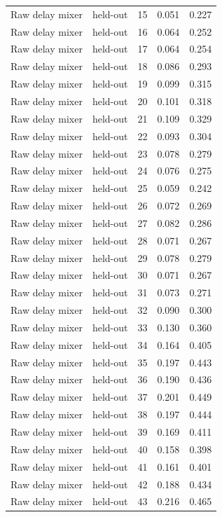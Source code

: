 \begin{tabular}{llrrr}
Raw delay mixer & held-out & 15 & 0.051 & 0.227 \\
Raw delay mixer & held-out & 16 & 0.064 & 0.252 \\
Raw delay mixer & held-out & 17 & 0.064 & 0.254 \\
Raw delay mixer & held-out & 18 & 0.086 & 0.293 \\
Raw delay mixer & held-out & 19 & 0.099 & 0.315 \\
Raw delay mixer & held-out & 20 & 0.101 & 0.318 \\
Raw delay mixer & held-out & 21 & 0.109 & 0.329 \\
Raw delay mixer & held-out & 22 & 0.093 & 0.304 \\
Raw delay mixer & held-out & 23 & 0.078 & 0.279 \\
Raw delay mixer & held-out & 24 & 0.076 & 0.275 \\
Raw delay mixer & held-out & 25 & 0.059 & 0.242 \\
Raw delay mixer & held-out & 26 & 0.072 & 0.269 \\
Raw delay mixer & held-out & 27 & 0.082 & 0.286 \\
Raw delay mixer & held-out & 28 & 0.071 & 0.267 \\
Raw delay mixer & held-out & 29 & 0.078 & 0.279 \\
Raw delay mixer & held-out & 30 & 0.071 & 0.267 \\
Raw delay mixer & held-out & 31 & 0.073 & 0.271 \\
Raw delay mixer & held-out & 32 & 0.090 & 0.300 \\
Raw delay mixer & held-out & 33 & 0.130 & 0.360 \\
Raw delay mixer & held-out & 34 & 0.164 & 0.405 \\
Raw delay mixer & held-out & 35 & 0.197 & 0.443 \\
Raw delay mixer & held-out & 36 & 0.190 & 0.436 \\
Raw delay mixer & held-out & 37 & 0.201 & 0.449 \\
Raw delay mixer & held-out & 38 & 0.197 & 0.444 \\
Raw delay mixer & held-out & 39 & 0.169 & 0.411 \\
Raw delay mixer & held-out & 40 & 0.158 & 0.398 \\
Raw delay mixer & held-out & 41 & 0.161 & 0.401 \\
Raw delay mixer & held-out & 42 & 0.188 & 0.434 \\
Raw delay mixer & held-out & 43 & 0.216 & 0.465 \\

\end{tabular}
